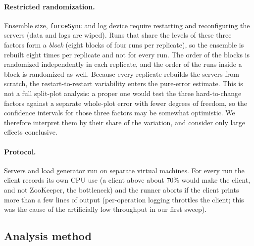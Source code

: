 \begin{table}[h]
  \centering
  \caption{Alias structure ($I=ABCDEF$, resolution VI): main effects and two-factor interactions.}
  \label{tab:alias}
  \footnotesize
\end{table}

\paragraph{Restricted randomization.} Ensemble size, \texttt{forceSync} and log device require restarting and
reconfiguring the servers (data and logs are wiped). Runs that share the levels of these three factors form a
\emph{block} (eight blocks of four runs per replicate), so the ensemble is rebuilt eight times per replicate and
not for every run. The order of the blocks is randomized independently in each replicate, and the order of the
runs inside a block is randomized as well. Because every replicate rebuilds the servers from scratch, the
restart-to-restart variability enters the pure-error estimate. This is not a full split-plot analysis: a proper
one would test the three hard-to-change factors against a separate whole-plot error with fewer degrees of
freedom, so the confidence intervals for those three factors may be somewhat optimistic. We therefore interpret
them by their share of the variation, and consider only large effects conclusive.

\paragraph{Protocol.} Servers and load generator run on separate virtual machines. For every run the client
records its own CPU use (a client above about 70\% would make the client, and not ZooKeeper, the bottleneck)
and the runner aborts if the client prints more than a few lines of output (per-operation logging throttles the
client; this was the cause of the artificially low throughput in our first sweep).

\subsection{Analysis method}

